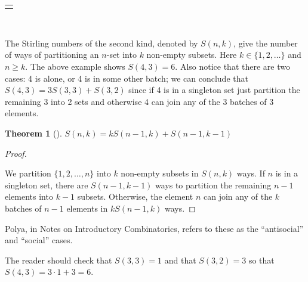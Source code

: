 \documentclass[10pt,]{book}
\theoremstyle{plain}
\newtheorem{theorem}{Theorem}[section]
\theoremstyle{definition}
\theoremstyle{definition}
\numberwithin{equation}{chapter}
\newlength{\panelmax}
\begin{document}
{%
\setlength{\panelmax}{0pt}
\ifdefined\panelboxAtabular\else\newsavebox{\panelboxAtabular}\fi%
\ifdefined\phAtabular\else\newlength{\phAtabular}\fi%
\setlength{\phAtabular}{\ht\panelboxAtabular+\dp\panelboxAtabular}
\settototalheight{\phAtabular}{\usebox{\panelboxAtabular}}
\setlength{\panelmax}{\maxof{\panelmax}{\phAtabular}}
\leavevmode%
\setlength{\tabcolsep}{0\linewidth}
\par\medskip\noindent
\hspace*{0.25\linewidth}%
\begin{tabular}{@{}*{1}{c}@{}}
\begin{minipage}[c][\panelmax][t]{0.5\linewidth}\usebox{\panelboxAtabular}\end{minipage}\end{tabular}\\
}%
\par
\hypertarget{p-109}{}%
The Stirling numbers of the second kind, denoted by \(S(n,k)\), give the number of ways of partitioning an \(n\)-set into \(k\) non-empty subsets. Here \(k \in \{1,2,\ldots\}\) and \(n \geq k\). The above example shows \(S(4, 3) = 6\). Also notice that there are two cases: 4 is alone, or 4 is in some other batch; we can conclude that \(S(4, 3) = 3S(3,3) + S(3,2)\) since if 4 is in a singleton set just partition the remaining 3 into 2 sets and otherwise 4 can join any of the 3 batches of 3 elements.%
\begin{theorem}[{}]\label{thm-stirling-recursion}
\hypertarget{p-110}{}%
\(S(n,k) = kS(n - 1,k) + S(n - 1,k - 1)\)%
\end{theorem}
\begin{proof}\hypertarget{proof-1}{}
\hypertarget{p-111}{}%
We partition \(\{1,2,\ldots,n\}\) into \(k\) non-empty subsets in \(S(n,k)\) ways. If \(n\) is in a singleton set, there are \(S(n - 1,k - 1)\) ways to partition the remaining \(n - 1\) elements into \(k - 1\) subsets. Otherwise, the element \(n\) can join any of the \(k\) batches of \(n-1\) elements in \(kS(n - 1,k)\) ways.%
\end{proof}
\hypertarget{p-112}{}%
Polya, in Notes on Introductory Combinatorics, refers to these as the ``antisocial'' and ``social'' cases.%
\par
\hypertarget{p-113}{}%
The reader should check that \(S(3,3) = 1\) and that \(S(3,2) = 3\) so that \(S(4,3) = 3 \cdot 1 + 3 = 6\).%
\typeout{************************************************}
\typeout{************************************************}
\end{document}
